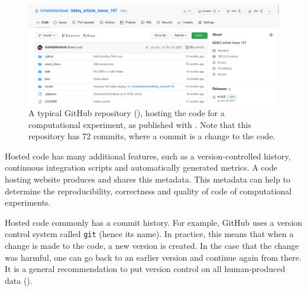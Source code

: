 \begin{figure}[!htbp]
  \centering
  \includegraphics[width=\linewidth]{bbbq_article_issue_157.png}
  \caption{
    A typical GitHub repository (\cite{bbbqarticleissue157}), 
    hosting the code for a
    computational experiment, 
    as published with \cite{bilderbeek2022transmembrane}.
    Note that this repository has 72 commits, where a commit is a change
    to the code.
  }
  \label{fig:bbbqarticleissue157}
\end{figure}


Hosted code has many additional features, such as
a version-controlled history, continuous integration scripts
and automatically generated metrics.
A code hosting website produces and shares this metadata.
This metadata can help to determine the
reproducibility, correctness and quality of code
of computational experiments.


Hosted code commonly has a commit history. For example, GitHub
uses a version control system called \verb|git| (hence its name).
In practice, this means that when a change is made to the code,
a new version is created. In the case that the change was harmful,
one can go back to an earlier version and continue again from there.
It is a general recommendation to put version control
on all human-produced data (\cite{wilson2014best}).


